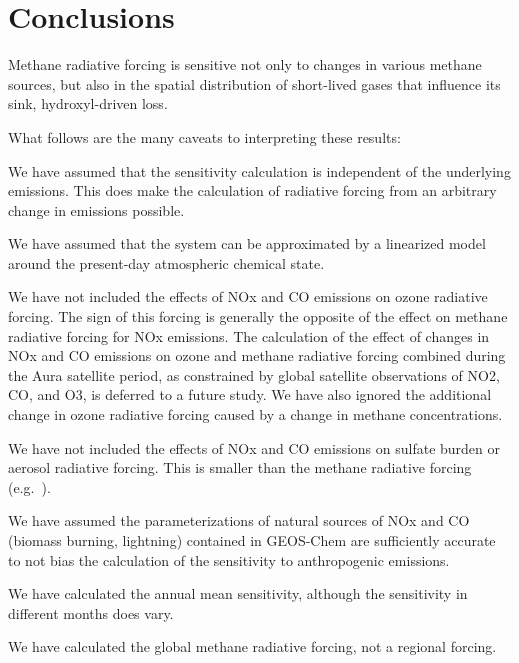 \section{Conclusions}

Methane radiative forcing is sensitive not only to changes in various methane sources, but also in the spatial distribution of short-lived gases that influence its sink, hydroxyl-driven loss.

What follows are the many caveats to interpreting these results:

We have assumed that the sensitivity calculation is independent of the underlying emissions. This does make the calculation of radiative forcing from an arbitrary change in emissions possible.

We have assumed that the system can be approximated by a linearized model around the present-day atmospheric chemical state.

We have not included the effects of NOx and CO emissions on ozone radiative forcing. The sign of this forcing is generally the opposite of the effect on methane radiative forcing for NOx emissions. The calculation of the effect of changes in NOx and CO emissions on ozone and methane radiative forcing combined during the Aura satellite period, as constrained by global satellite observations of NO2, CO, and O3, is deferred to a future study. We have also ignored the additional change in ozone radiative forcing caused by a change in methane concentrations.

We have not included the effects of NOx and CO emissions on sulfate burden or aerosol radiative forcing. This is smaller than the methane radiative forcing (e.g.~\citet{ref:fry2012}).

We have assumed the parameterizations of natural sources of NOx and CO (biomass burning, lightning) contained in GEOS-Chem are sufficiently accurate to not bias the calculation of the sensitivity to anthropogenic emissions.

We have calculated the annual mean sensitivity, although the sensitivity in different months does vary.

We have calculated the global methane radiative forcing, not a regional forcing.
